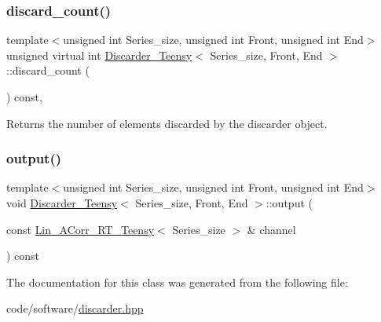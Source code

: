 \subsubsection{\texorpdfstring{discard\+\_\+count()}{discard\_count()}}
{\footnotesize\ttfamily template$<$unsigned int Series\+\_\+size, unsigned int Front, unsigned int End$>$ \\
unsigned virtual int \hyperlink{classDiscarder__Teensy}{Discarder\+\_\+\+Teensy}$<$ Series\+\_\+size, Front, End $>$\+::discard\+\_\+count (\begin{DoxyParamCaption}{ }\end{DoxyParamCaption}) const\hspace{0.3cm}{\ttfamily [inline]}, {\ttfamily [virtual]}}



Returns the number of elements discarded by the discarder object. 

\mbox{\label{classDiscarder__Teensy_a50787ecd4fc07a1d1cf2b692af979ac7}} 
\subsubsection{\texorpdfstring{output()}{output()}}
{\footnotesize\ttfamily template$<$unsigned int Series\+\_\+size, unsigned int Front, unsigned int End$>$ \\
void \hyperlink{classDiscarder__Teensy}{Discarder\+\_\+\+Teensy}$<$ Series\+\_\+size, Front, End $>$\+::output (\begin{DoxyParamCaption}\item[{const \hyperlink{classLin__ACorr__RT__Teensy}{Lin\+\_\+\+A\+Corr\+\_\+\+R\+T\+\_\+\+Teensy}$<$ Series\+\_\+size $>$ \&}]{channel }\end{DoxyParamCaption}) const\hspace{0.3cm}{\ttfamily [inline]}}



The documentation for this class was generated from the following file\+:\begin{DoxyCompactItemize}
\item 
code/software/\hyperlink{discarder_8hpp}{discarder.\+hpp}\end{DoxyCompactItemize}
